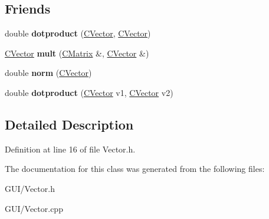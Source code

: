 \subsection*{Friends}
\begin{DoxyCompactItemize}
\item 
\mbox{\label{class_c_vector_a668f152d05b1e53b4bddb30a9a40c396}} 
double {\bfseries dotproduct} (\hyperlink{class_c_vector}{C\+Vector}, \hyperlink{class_c_vector}{C\+Vector})
\item 
\mbox{\label{class_c_vector_ae3bcb59ce5bd16a62ea69b6f2ebf767c}} 
\hyperlink{class_c_vector}{C\+Vector} {\bfseries mult} (\hyperlink{class_c_matrix}{C\+Matrix} \&, \hyperlink{class_c_vector}{C\+Vector} \&)
\item 
\mbox{\label{class_c_vector_a986b73faa24abe6267af8ba7ec237423}} 
double {\bfseries norm} (\hyperlink{class_c_vector}{C\+Vector})
\item 
\mbox{\label{class_c_vector_a3cd3ecd10ce12624927314bdc110ce2c}} 
double {\bfseries dotproduct} (\hyperlink{class_c_vector}{C\+Vector} v1, \hyperlink{class_c_vector}{C\+Vector} v2)
\end{DoxyCompactItemize}


\subsection{Detailed Description}


Definition at line 16 of file Vector.\+h.



The documentation for this class was generated from the following files\+:\begin{DoxyCompactItemize}
\item 
G\+U\+I/Vector.\+h\item 
G\+U\+I/Vector.\+cpp\end{DoxyCompactItemize}
